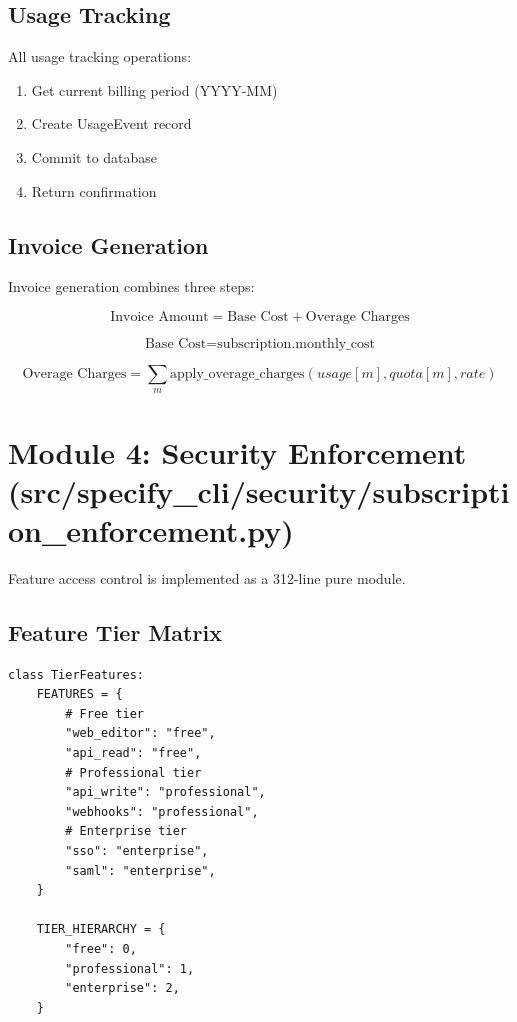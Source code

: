 \documentclass[12pt]{report}
\begin{document}
\subsection{Usage Tracking}

All usage tracking operations:
\begin{enumerate}
    \item Get current billing period (YYYY-MM)
    \item Create UsageEvent record
    \item Commit to database
    \item Return confirmation
\end{enumerate}

\subsection{Invoice Generation}

Invoice generation combines three steps:

\begin{equation}
\text{Invoice Amount} = \text{Base Cost} + \text{Overage Charges}
\end{equation}

\begin{equation}
\text{Base Cost} = \text{subscription.monthly\_cost}
\end{equation}

\begin{equation}
\text{Overage Charges} = \sum_{m} \text{apply\_overage\_charges}(usage[m], quota[m], rate)
\end{equation}

\section{Module 4: Security Enforcement (src/specify\_cli/security/subscription\_enforcement.py)}

Feature access control is implemented as a 312-line pure module.

\subsection{Feature Tier Matrix}

\begin{lstlisting}
class TierFeatures:
    FEATURES = {
        # Free tier
        "web_editor": "free",
        "api_read": "free",
        # Professional tier
        "api_write": "professional",
        "webhooks": "professional",
        # Enterprise tier
        "sso": "enterprise",
        "saml": "enterprise",
    }

    TIER_HIERARCHY = {
        "free": 0,
        "professional": 1,
        "enterprise": 2,
    }
\end{lstlisting}
\end{document}
